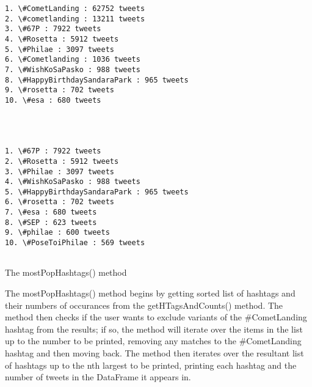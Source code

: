 \documentclass[11pt]{article}
\begin{document}
    \begin{Verbatim}[commandchars=\\\{\}]
1. \#CometLanding : 62752 tweets
2. \#cometlanding : 13211 tweets
3. \#67P : 7922 tweets
4. \#Rosetta : 5912 tweets
5. \#Philae : 3097 tweets
6. \#Cometlanding : 1036 tweets
7. \#WishKoSaPasko : 988 tweets
8. \#HappyBirthdaySandaraPark : 965 tweets
9. \#rosetta : 702 tweets
10. \#esa : 680 tweets




1. \#67P : 7922 tweets
2. \#Rosetta : 5912 tweets
3. \#Philae : 3097 tweets
4. \#WishKoSaPasko : 988 tweets
5. \#HappyBirthdaySandaraPark : 965 tweets
6. \#rosetta : 702 tweets
7. \#esa : 680 tweets
8. \#SEP : 623 tweets
9. \#philae : 600 tweets
10. \#PoseToiPhilae : 569 tweets


    \end{Verbatim}

    The mostPopHashtags() method

The mostPopHashtags() method begins by getting sorted list of hashtags
and their numbers of occurances from the getHTagsAndCounts() method. The
method then checks if the user wants to exclude variants of the
\#CometLanding hashtag from the results; if so, the method will iterate
over the items in the list up to the number to be printed, removing any
matches to the \#CometLanding hashtag and then moving back. The method
then iterates over the resultant list of hashtags up to the nth largest
to be printed, printing each hashtag and the number of tweets in the
DataFrame it appears in.
\end{document}
